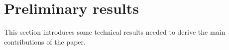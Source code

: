 \documentclass[letterpaper,10pt,twocolumn,journal,final]{IEEEtran}
\newtheorem{lem}[thm]{Lemma}
\newcommand{\eps}{\epsilon}
\newcommand{\ellips}{\mathcal{E}}
\begin{document}
\section{Preliminary results}\label{sec:prelimanaries}
This section introduces some technical results needed to derive the main contributions of the paper.
\end{document}

